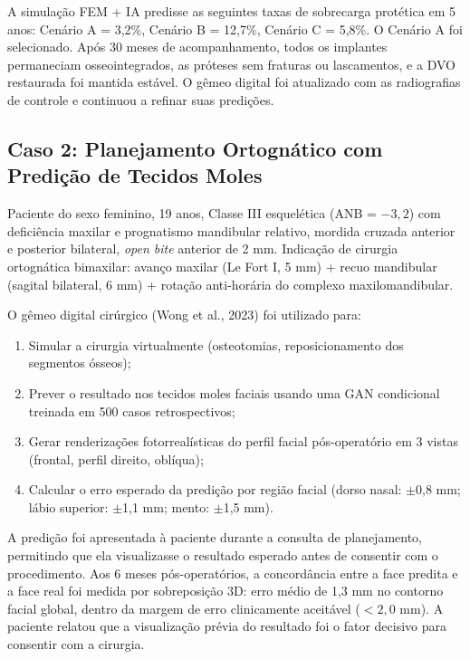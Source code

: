 A simulação FEM + IA predisse as seguintes taxas de sobrecarga protética em 5 anos: Cenário A = 3,2\%, Cenário B = 12,7\%, Cenário C = 5,8\%. O Cenário A foi selecionado. Após 30 meses de acompanhamento, todos os implantes permaneciam osseointegrados, as próteses sem fraturas ou lascamentos, e a DVO restaurada foi mantida estável. O gêmeo digital foi atualizado com as radiografias de controle e continuou a refinar suas predições.


\subsection{Caso 2: Planejamento Ortognático com Predição de Tecidos Moles}

Paciente do sexo feminino, 19 anos, Classe III esquelética (ANB = $-3,2$\textdegree{}) com deficiência maxilar e prognatismo mandibular relativo, mordida cruzada anterior e posterior bilateral, \textit{open bite} anterior de 2 mm. Indicação de cirurgia ortognática bimaxilar: avanço maxilar (Le Fort I, 5 mm) + recuo mandibular (sagital bilateral, 6 mm) + rotação anti-horária do complexo maxilomandibular.

O gêmeo digital cirúrgico (Wong et al., 2023) foi utilizado para:
\begin{enumerate}
    \item Simular a cirurgia virtualmente (osteotomias, reposicionamento dos segmentos ósseos);
    \item Prever o resultado nos tecidos moles faciais usando uma GAN condicional treinada em 500 casos retrospectivos;
    \item Gerar renderizações fotorrealísticas do perfil facial pós-operatório em 3 vistas (frontal, perfil direito, oblíqua);
    \item Calcular o erro esperado da predição por região facial (dorso nasal: $\pm$0,8 mm; lábio superior: $\pm$1,1 mm; mento: $\pm$1,5 mm).
\end{enumerate}

A predição foi apresentada à paciente durante a consulta de planejamento, permitindo que ela visualizasse o resultado esperado antes de consentir com o procedimento. Aos 6 meses pós-operatórios, a concordância entre a face predita e a face real foi medida por sobreposição 3D: erro médio de 1,3 mm no contorno facial global, dentro da margem de erro clinicamente aceitável ($<2,0$ mm). A paciente relatou que a visualização prévia do resultado foi o fator decisivo para consentir com a cirurgia.

